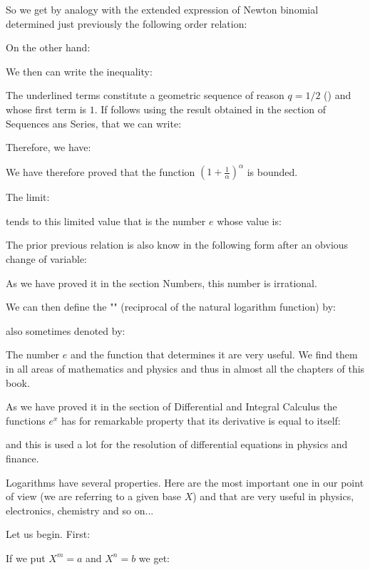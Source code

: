 	So we get by analogy with the extended expression of Newton binomial determined just previously the following order relation:
	
	On the other hand:
	
	We then can write the inequality:
	
	The underlined terms constitute a geometric sequence of reason $q=1/2$ () and whose first term is $1$. If follows using the result obtained in the section of Sequences ans Series, that we can write:
	
	Therefore, we have:
	
	We have therefore proved that the function $\left(1+\frac{1}{\alpha}\right)^\alpha$ is bounded.
	
	The limit:
	
	tends to this limited value that is the number $e$ whose value is:
	
	The prior previous relation is also know in the following form after an obvious change of variable:
	
	\begin{tcolorbox}[title=Remark,colframe=black,arc=10pt]
	As we have proved it in the section Numbers, this number is irrational.
	\end{tcolorbox}
	We can then define the "\label{natural exponential function}" (reciprocal of the natural logarithm function) by:
	
	also sometimes denoted by:
	
	The number $e$ and the function that determines it are very useful. We find them in all areas of mathematics and physics and thus in almost all the chapters of this book.
	
	As we have proved it in the section of Differential and Integral Calculus the functions $e^x$ has for remarkable property that its derivative is equal to itself:
	
	and this is used a lot for the resolution of differential equations in physics and finance.
	
	Logarithms have several properties. Here are the most important one in our point of view (we are referring to a given base $X$) and that are very useful in physics, electronics, chemistry and so on...
	
	Let us begin. First:
	
	If we put $X^m=a$ and $X^n=b$ we get:
	
